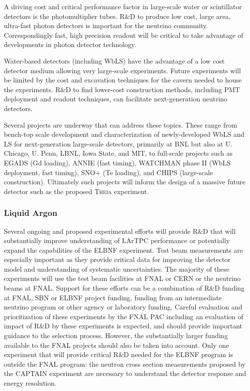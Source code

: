 A driving cost and critical performance factor in large-scale water or scintillator detectors is the 
photomultiplier tubes. R\&D to produce low cost, large area, ultra-fast photon detectors is important for 
the neutrino community. Correspondingly fast, high precision readout will be critical to take advantage of 
developments in photon detector technology.

Water-based detectors (including WbLS) have the advantage of a low cost detector medium allowing 
very large-scale experiments. Future experiments will be limited by the cost and excavation techniques 
for the cavern needed to house the experiments. R\&D to find lower-cost construction methods, including 
PMT deployment and readout techniques, can facilitate next-generation neutrino detectors.

Several projects are underway that can address these topics. These range from bench-top scale 
development and characterization of newly-developed WbLS and LS for next-generation large-scale detectors, primarily at BNL but also at U. Chicago, U. Penn, LBNL, Iowa State, 
and MIT, to full-scale projects such as EGADS (Gd loading), ANNIE (fast timing), WATCHMAN phase II 
(WbLS deployment, fast timing), SNO+ (Te loading), and CHIPS (large-scale construction). Ultimately 
such projects will inform the design of a massive future detector such as the proposed \textsc{Theia} 
experiment.


\subsubsection{Liquid Argon}

Several ongoing and proposed experimental efforts will provide R\&D that will 
substantially improve understanding of LArTPC performance or potentially expand the 
capabilities of the ELBNF experiment. Test beam measurements are especially important as they 
provide critical data for improving the detector model and understanding of systematic uncertainties. 
The majority of these experiments will use the test beam facilities at FNAL or CERN or the neutrino 
beams at FNAL. Support for these efforts can be a combination of R\&D funding at FNAL, SBN or 
ELBNF project funding, funding from an intermediate neutrino program or other agency or laboratory funding. 
Careful evaluation and prioritization of these experiments by the FNAL PAC including an evaluation of 
impact of R\&D by these experiments is expected, and should provide important guidance to the 
selection process. However, the substantially larger funding available to the FNAL projects should also 
be taken into account. Only one experiment that will provide critical R\&D needed for the ELBNF 
program is outside the FNAL program: the neutron cross section measurements proposed by the 
CAPTAIN experiment are necessary to understand the detector response and energy resolution.

